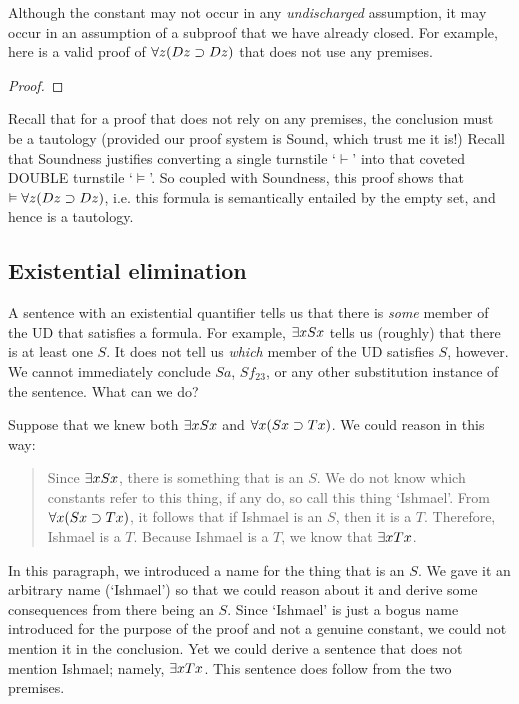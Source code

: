 Although the constant  may not occur in any \emph{undischarged} assumption, it may occur in an assumption of a subproof that we have already closed. For example, here is a valid proof of $\forall z(Dz \supset Dz)$ that does not use any premises. 

\begin{proof}
	\open
	\close
\end{proof}

{\color{black}Recall that for a proof that does not rely on any premises, the conclusion must be a tautology (provided our proof system is Sound, which trust me it is!) Recall that Soundness justifies converting a single turnstile `$\vdash$' into that coveted DOUBLE turnstile `$\models$'. So coupled with Soundness, this proof shows that $\vDash \forall z(Dz \supset Dz)$, i.e. this formula is semantically entailed by the empty set, and hence is a tautology.}

\subsection{Existential elimination}
A sentence with an existential quantifier tells us that there is \emph{some} member of the UD that satisfies a formula. For example, $\exists x Sx$ tells us (roughly) that there is at least one $S$. It does not tell us \emph{which} member of the UD satisfies $S$, however. We cannot immediately conclude $Sa$, $Sf_{23}$, or any other substitution instance of the sentence. What can we do?

Suppose that we knew both $\exists x Sx$ and $\forall x(Sx \supset Tx)$. We could reason in this way:
\begin{quote}
Since $\exists x Sx$, there is something that is an $S$. We do not know which constants refer to this thing, if any do, so call this thing `Ishmael'. From $\forall x(Sx \supset Tx)$, it follows that if Ishmael is an $S$, then it is a $T$. Therefore, Ishmael is a $T$.  Because Ishmael is a $T$, we know that $\exists x Tx$.
\end{quote}
In this paragraph, we introduced a name for the thing that is an $S$. We gave it an arbitrary name (`Ishmael') so that we could reason about it and derive some consequences from there being an $S$. Since `Ishmael' is just a bogus name introduced for the purpose of the proof and not a genuine constant, we could not mention it in the conclusion. Yet we could derive a sentence that does not mention Ishmael; namely, $\exists x Tx$. This sentence does follow from the two premises.


